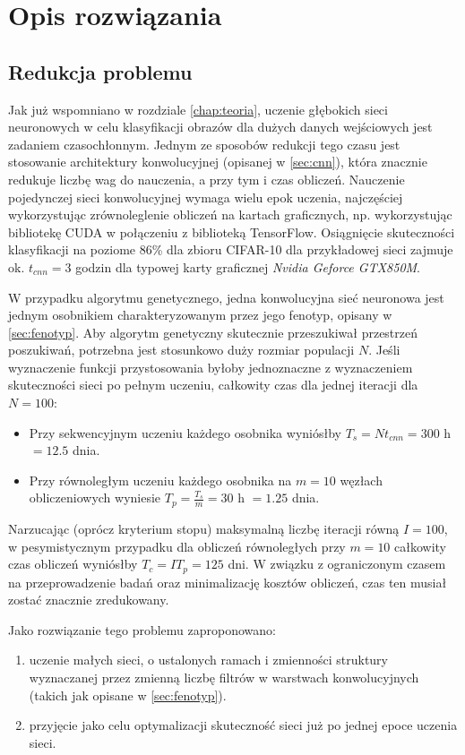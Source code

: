 \chapter{Opis rozwiązania}\label{chap:system_description}
\section{Redukcja problemu}\label{sec:reduction}
Jak już wspomniano w rozdziale \ref{chap:teoria}, uczenie głębokich sieci neuronowych w celu klasyfikacji obrazów dla dużych danych wejściowych jest zadaniem czasochłonnym.
Jednym ze sposobów redukcji tego czasu jest stosowanie architektury konwolucyjnej (opisanej w \ref{sec:cnn}), która znacznie redukuje liczbę wag do nauczenia, a przy tym i czas obliczeń.
Nauczenie pojedynczej sieci konwolucyjnej wymaga wielu epok uczenia, najczęściej wykorzystując zrównoleglenie obliczeń na kartach graficznych, np. wykorzystując bibliotekę CUDA w połączeniu z biblioteką TensorFlow.
Osiągnięcie skuteczności klasyfikacji na poziome 86\% dla zbioru CIFAR-10 dla przykładowej sieci zajmuje ok. $t_{cnn} = 3$ godzin dla typowej karty graficznej \textit{Nvidia Geforce GTX850M}. \cite{tensorflow2015-whitepaper}

W przypadku algorytmu genetycznego, jedna konwolucyjna sieć neuronowa jest jednym osobnikiem charakteryzowanym przez jego fenotyp, opisany w \ref{sec:fenotyp}.
Aby algorytm genetyczny skutecznie przeszukiwał przestrzeń poszukiwań, potrzebna jest stosunkowo duży rozmiar populacji $N$.
Jeśli wyznaczenie funkcji przystosowania byłoby jednoznaczne z wyznaczeniem skuteczności sieci po pełnym uczeniu, całkowity czas dla jednej iteracji dla $N = 100$:
 \begin{itemize}
	\item Przy sekwencyjnym uczeniu każdego osobnika wyniósłby $T_s = Nt_{cnn} = 300$ h$ =  12.5 $ dnia.
	\item Przy równoległym uczeniu każdego osobnika na $m = 10$ węzłach obliczeniowych wyniesie $T_p = \frac{T_s}{m} = 30$ h $= 1.25$ dnia.
\end{itemize}
Narzucając (oprócz kryterium stopu) maksymalną liczbę iteracji równą $I = 100$, w pesymistycznym przypadku dla obliczeń równoległych przy $m = 10$ całkowity czas obliczeń wyniósłby $T_c=IT_p=125$ dni.
W związku z ograniczonym czasem na przeprowadzenie badań oraz minimalizację kosztów obliczeń, czas ten musiał zostać znacznie zredukowany.

Jako rozwiązanie tego problemu zaproponowano:
\begin{enumerate}
	\item uczenie małych sieci, o ustalonych ramach i zmienności struktury wyznaczanej przez zmienną liczbę filtrów w warstwach konwolucyjnych (takich jak opisane w \ref{sec:fenotyp}).
	\item przyjęcie jako celu optymalizacji skuteczność sieci już po jednej epoce uczenia sieci.
\end{enumerate}

